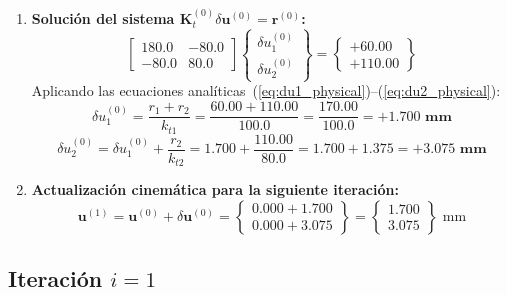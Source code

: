 \documentclass[11pt,letterpaper]{article}
\begin{document}
\begin{stepbox}
\begin{enumerate}
\[        \det(\mathbf{K}_t^{(0)}) = 100.0 \times 80.0 = 8000.0
    \]
    \item \textbf{Solución del sistema $\mathbf{K}_t^{(0)} \delta \mathbf{u}^{(0)} = \mathbf{r}^{(0)}$:}
    \[
        \begin{bmatrix} 180.0 & -80.0 \\ -80.0 & 80.0 \end{bmatrix} \begin{Bmatrix} \delta u_1^{(0)} \\ \delta u_2^{(0)} \end{Bmatrix} = \begin{Bmatrix} +60.00 \\ +110.00 \end{Bmatrix}
    \]
    Aplicando las ecuaciones analíticas~(\ref{eq:du1_physical})--(\ref{eq:du2_physical}):
    \[
        \delta u_1^{(0)} = \frac{r_1 + r_2}{k_{t1}} = \frac{60.00 + 110.00}{100.0} = \frac{170.00}{100.0} = \mathbf{+1.700\text{ mm}}
    \]
    \[
        \delta u_2^{(0)} = \delta u_1^{(0)} + \frac{r_2}{k_{t2}} = 1.700 + \frac{110.00}{80.0} = 1.700 + 1.375 = \mathbf{+3.075\text{ mm}}
    \]
    \item \textbf{Actualización cinemática para la siguiente iteración:}
    \[
        \mathbf{u}^{(1)} = \mathbf{u}^{(0)} + \delta \mathbf{u}^{(0)} = \begin{Bmatrix} 0.000 + 1.700 \\ 0.000 + 3.075 \end{Bmatrix} = \begin{Bmatrix} \mathbf{1.700} \\ \mathbf{3.075} \end{Bmatrix}\text{ mm}
    \]
\end{enumerate}
\end{stepbox}

\subsection{Iteración \texorpdfstring{$i = 1$}{i = 1}}
\end{document}
